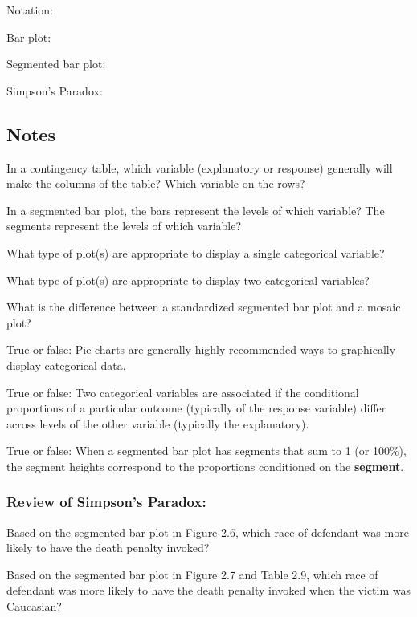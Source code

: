 \documentclass[
]{report}
\newcommand{\rgs}{\vspace{12pt}} %
\newcommand{\rgi}{\hspace{24pt}}  %
\begin{document}
\rgi \rgi Notation:
\rgs

Bar plot:
\rgs

Segmented bar plot:
\rgs

Simpson's Paradox:
\rgs

\newpage

\hypertarget{notes-1}{%
\subsection*{Notes}\label{notes-1}}

In a contingency table, which variable (explanatory or response) generally will make the columns of the table? Which variable on the rows?
\rgs

In a segmented bar plot, the bars represent the levels of which variable? The segments represent the levels of which variable?
\rgs

What type of plot(s) are appropriate to display a single categorical variable?
\rgs

What type of plot(s) are appropriate to display two categorical variables?
\rgs

What is the difference between a standardized segmented bar plot and a mosaic plot?
\rgs

True or false: Pie charts are generally highly recommended ways to graphically display categorical data.

True or false: Two categorical variables are associated if the conditional proportions of a particular outcome (typically of the response variable) differ across levels of the other variable (typically the explanatory).

True or false: When a segmented bar plot has segments that sum to 1 (or 100\%), the segment heights correspond to the proportions conditioned on the \textbf{segment}.

\hypertarget{review-of-simpsons-paradox}{%
\subsubsection*{Review of Simpson's Paradox:}\label{review-of-simpsons-paradox}}

Based on the segmented bar plot in Figure 2.6, which race of defendant was more likely to have the death penalty invoked?
\rgs

Based on the segmented bar plot in Figure 2.7 and Table 2.9, which race of defendant was more likely to have the death penalty invoked when the victim was Caucasian?
\rgs
\end{document}
